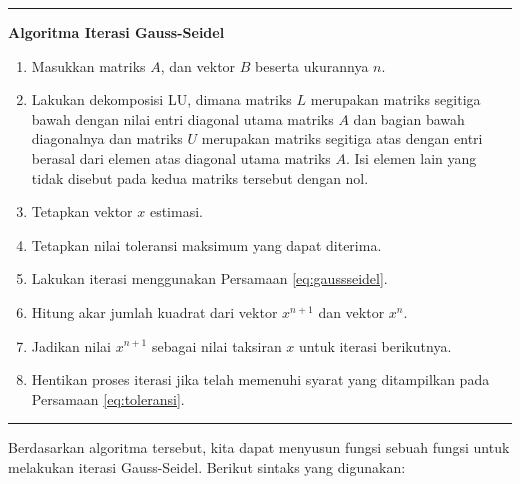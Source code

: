 \documentclass[
]{book}
\providecommand{\tightlist}{%
  \setlength{\itemsep}{0pt}\setlength{\parskip}{0pt}}
\theoremstyle{definition}
\theoremstyle{definition}
\theoremstyle{definition}
\theoremstyle{definition}
\theoremstyle{remark}
\begin{document}
\begin{center}\rule{0.5\linewidth}{0.5pt}\end{center}

\textbf{Algoritma Iterasi Gauss-Seidel}

\begin{enumerate}
\def\labelenumi{\arabic{enumi}.}
\tightlist
\item
  Masukkan matriks \(A\), dan vektor \(B\) beserta ukurannya \(n\).
\item
  Lakukan dekomposisi LU, dimana matriks \(L\) merupakan matriks segitiga bawah dengan nilai entri diagonal utama matriks \(A\) dan bagian bawah diagonalnya dan matriks \(U\) merupakan matriks segitiga atas dengan entri berasal dari elemen atas diagonal utama matriks \(A\). Isi elemen lain yang tidak disebut pada kedua matriks tersebut dengan nol.
\item
  Tetapkan vektor \(x\) estimasi.
\item
  Tetapkan nilai toleransi maksimum yang dapat diterima.
\item
  Lakukan iterasi menggunakan Persamaan \eqref{eq:gaussseidel}.
\item
  Hitung akar jumlah kuadrat dari vektor \(x^{n+1}\) dan vektor \(x^n\).
\item
  Jadikan nilai \(x^{n+1}\) sebagai nilai taksiran \(x\) untuk iterasi berikutnya.
\item
  Hentikan proses iterasi jika telah memenuhi syarat yang ditampilkan pada Persamaan \eqref{eq:toleransi}.
\end{enumerate}

\begin{center}\rule{0.5\linewidth}{0.5pt}\end{center}

Berdasarkan algoritma tersebut, kita dapat menyusun fungsi sebuah fungsi untuk melakukan iterasi Gauss-Seidel. Berikut sintaks yang digunakan:
\end{document}
